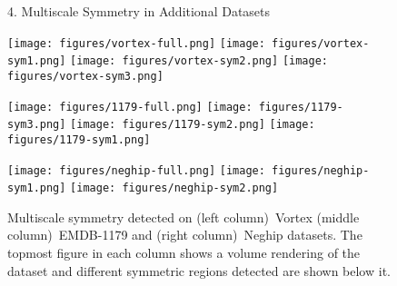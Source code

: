 \documentclass[review,journal]{vgtc}         %
\begin{document}
\begin{figure*}
\centering
{\sffamily\large{4. Multiscale Symmetry in Additional Datasets\\}}
\vspace{0.5cm}
\centering
\begin{minipage}{0.33\textwidth}
	\centering
	\subfigure
	{
		\texttt{[image: figures/vortex-full.png]}
	}
	\subfigure
	{
		\texttt{[image: figures/vortex-sym1.png]}
	}
	\subfigure
	{
		\texttt{[image: figures/vortex-sym2.png]}
	}
	\subfigure
	{
		\texttt{[image: figures/vortex-sym3.png]}
	}
\end{minipage}
\begin{minipage}{0.33\textwidth}
	\centering
	\subfigure
	{
		\texttt{[image: figures/1179-full.png]}
	}
	\subfigure
	{
		\texttt{[image: figures/1179-sym3.png]}
	}
	\subfigure
	{
		\texttt{[image: figures/1179-sym2.png]}
	}
	\subfigure
	{
		\texttt{[image: figures/1179-sym1.png]}
	}
\end{minipage}
\begin{minipage}{0.33\textwidth}
	\subfigure
	{
		\texttt{[image: figures/neghip-full.png]}
	}
	\subfigure
	{
		\texttt{[image: figures/neghip-sym1.png]}
	}
	\subfigure
	{
		\texttt{[image: figures/neghip-sym2.png]}
	}
\end{minipage}
\caption{\label{addres}Multiscale symmetry detected on (left column)~Vortex (middle column)~EMDB-1179 and (right column)~Neghip datasets.
	The topmost figure in each column shows a volume rendering of the dataset and different symmetric regions detected
are shown below it.}
\end{figure*}
\end{document}
